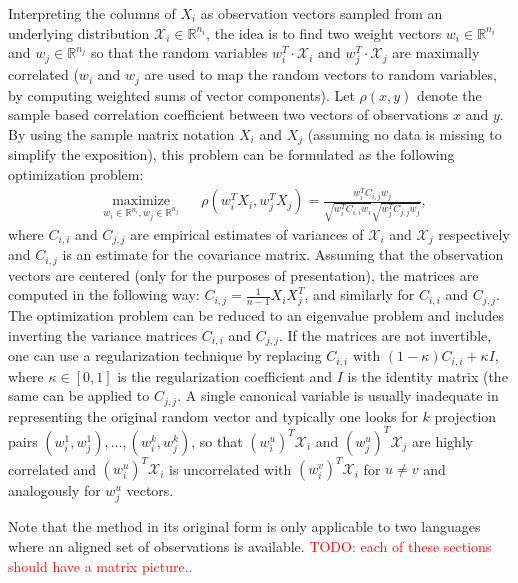 \documentclass[twoside,11pt]{article}
\newcommand{\todo}[1]{\textcolor{red}{TODO: #1}}
\newcommand{\RR}{\mathbb{R}}
\begin{document}
Interpreting the columns of $X_i$ as observation vectors sampled from an underlying distribution $\mathcal{X}_i \in \RR^{n_i}$, the idea is to find two weight vectors $w_i \in \RR^{n_i}$ and $w_j \in \RR^{n_j}$ so that the random variables $w_i^T \cdot \mathcal{X}_i$ and $w_j^T \cdot \mathcal{X}_j$ are maximally correlated ($w_i$ and $w_j$ are used to map the random vectors to random variables, by computing weighted sums of vector components). Let $\rho(x,y)$ denote the sample based correlation coefficient between two vectors of observations $x$ and $y$. By using the sample matrix notation $X_i$ and $X_j$ (assuming no data is missing to simplify the exposition), this problem can be formulated as the following optimization problem:
\begin{equation*}
\begin{aligned}
& \underset{w_i \in \RR^{n_i}, w_j \in \RR^{n_j}}{\text{maximize}}
& & \rho(w_i^T X_i , w_j^T X_j) = \frac{w_i^T C_{i,j} w_j}{\sqrt{w_i^T C_{i,i} w_i} \sqrt{w_j^T C_{j,j} w_j}},
\end{aligned}
\end{equation*}
where $C_{i,i}$ and $C_{j,j}$ are empirical estimates of variances of $\mathcal{X}_i$ and $\mathcal{X}_j$ respectively and $C_{i,j}$ is an estimate for the covariance matrix. Assuming that the observation vectors are centered (only for the purposes of presentation), the matrices are computed in the following way: $C_{i,j} = \frac{1}{n-1}X_i X_j^T$, and similarly for $C_{i,i}$ and $C_{j,j}$.
The optimization problem can be reduced to an eigenvalue problem and includes inverting the variance matrices $C_{i,i}$ and $C_{j,j}$. If the matrices are not invertible, one can use a regularization technique by replacing $C_{i,i}$ with $(1- \kappa)C_{i,i} + \kappa I$, where $\kappa \in [0,1]$ is the regularization coefficient and $I$ is the identity matrix (the same can be applied to $C_{j,j}$.
A single canonical variable is usually inadequate in representing the original random vector and typically one looks for $k$ projection pairs $(w_i^1, w_j^1),\ldots,(w_i^k, w_j^k)$, so that $(w_i^{u})^T \mathcal{X}_i$ and $(w_j^{u})^T \mathcal{X}_j$ are highly correlated and $(w_i^{u})^T \mathcal{X}_i$ is uncorrelated with $(w_i^{v})^T \mathcal{X}_i$  for $u \neq v$ and analogously for $w_j^u$ vectors.

Note that the method in its original form is only applicable to two languages where an aligned set of observations is available.
\todo{each of these sections should have a matrix picture..}
\end{document}
